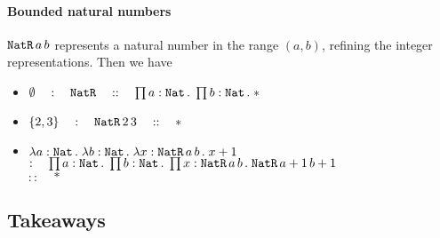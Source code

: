 \documentclass{article}
\newcommand{\TNat}{\text{\texttt{Nat}}}
\newcommand{\DT}{\, .\;}
\begin{document}
\paragraph{Bounded natural numbers}
  $\text{\texttt{NatR}}\, a\, b$ represents a natural number in the range $(a, b)$, refining the integer representations.
  Then we have
  \begin{itemize}
    \item $\emptyset \quad:\quad \text{\texttt{NatR}} \quad::\quad \prod a:\TNat\, .\;\prod b: \TNat\, .\; *$
    \item $\{2, 3\} \quad:\quad \text{\texttt{NatR}}\, 2\, 3\quad::\quad *$
    \item $\lambda a: \TNat \DT \lambda b: \TNat \DT \lambda x: \text{\texttt{NatR}}\, a\, b \DT x+1$\\
        $:\quad \prod a:\TNat\DT \prod b:\TNat\DT \prod x:\text{\texttt{NatR}}\, a\, b\DT \text{\texttt{NatR}}\, a+1\, b+1$\\
        $::\quad *$
  \end{itemize}

\subsection{Takeaways}
\end{document}
